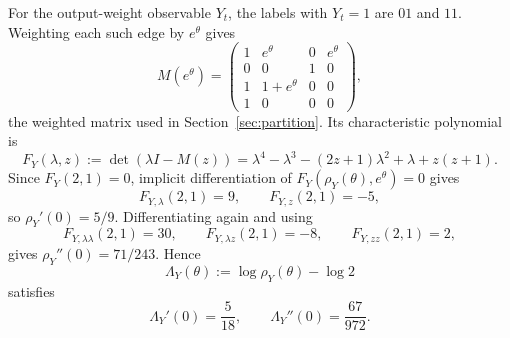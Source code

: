 For the output-weight observable \(Y_t\), the labels with \(Y_t=1\) are \(01\) and \(11\). Weighting each such edge by \(e^\theta\) gives
\[
M(e^\theta)=
\begin{pmatrix}
1& e^\theta &0& e^\theta\\
0&0&1&0\\
1&1+e^\theta&0&0\\
1&0&0&0
\end{pmatrix},
\]
the weighted matrix used in Section~\ref{sec:partition}. Its characteristic polynomial is
\[
F_Y(\lambda,z)
:=
\det(\lambda I-M(z))
=
\lambda^4-\lambda^3-(2z+1)\lambda^2+\lambda+z(z+1).
\]
Since \(F_Y(2,1)=0\), implicit differentiation of \(F_Y(\rho_Y(\theta),e^\theta)=0\) gives
\[
F_{Y,\lambda}(2,1)=9,\qquad
F_{Y,z}(2,1)=-5,
\]
so \(\rho_Y'(0)=5/9\). Differentiating again and using
\[
F_{Y,\lambda\lambda}(2,1)=30,\qquad
F_{Y,\lambda z}(2,1)=-8,\qquad
F_{Y,zz}(2,1)=2,
\]
gives \(\rho_Y''(0)=71/243\). Hence
\[
\Lambda_Y(\theta):=\log \rho_Y(\theta)-\log 2
\]
satisfies
\[
\Lambda_Y'(0)=\frac{5}{18},
\qquad
\Lambda_Y''(0)=\frac{67}{972}.
\]

